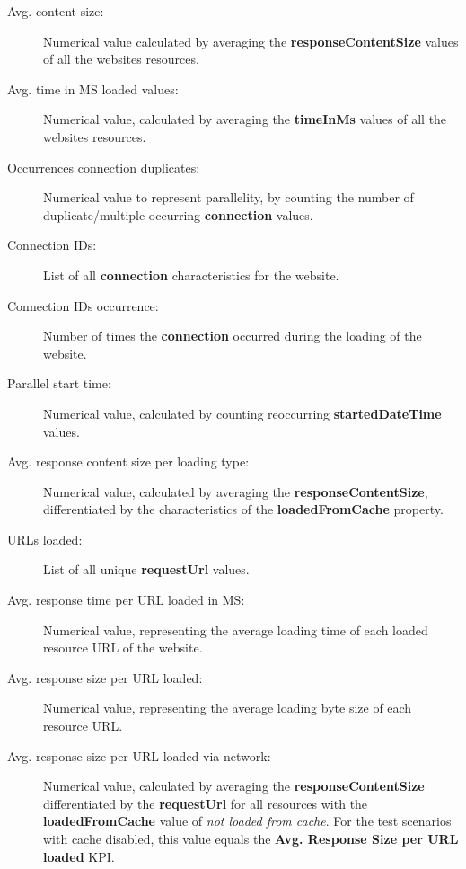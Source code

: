 \begin{description} 
	\item[Avg. content size:] Numerical value calculated by averaging the \textbf{responseContentSize} values of all the websites resources.
	
	\item[Avg. time in MS loaded values:] Numerical value, calculated by averaging the \newline \textbf{timeInMs} values of all the websites resources.
	
	\item[Occurrences connection duplicates:] Numerical value to represent parallelity, by counting the number of duplicate/multiple occurring \textbf{connection} values.
	
	\item[Connection IDs:] List of all \textbf{connection} characteristics for the website.
	
	\item[Connection IDs occurrence:] Number of times the \textbf{connection} occurred during the loading of the website.
	
	\item[Parallel start time:] Numerical value, calculated by counting reoccurring \textbf{startedDateTime} values.
	
	\item[Avg. response content size per loading type:] Numerical value, calculated by averaging the \textbf{responseContentSize}, differentiated by the characteristics of the \textbf{loadedFromCache} property.
	
	\item[URLs loaded:] List of all unique \textbf{requestUrl} values.
	
	\item[Avg. response time per URL loaded in MS:] Numerical value, representing the average loading time of each loaded resource URL of the website.
	
	\item[Avg. response size per URL loaded:] Numerical value, representing the average loading byte size of each resource URL.
	
	\item[Avg. response size per URL loaded via network:] Numerical value, calculated by averaging the \textbf{responseContentSize} differentiated by the \textbf{requestUrl} for all resources with the \textbf{loadedFromCache} value of \textit{not loaded from cache}. For the test scenarios with cache disabled, this value equals the \textbf{Avg. Response Size per URL loaded} KPI.
	

\end{description}
